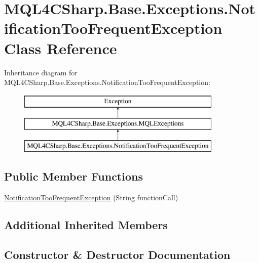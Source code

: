 \hypertarget{class_m_q_l4_c_sharp_1_1_base_1_1_exceptions_1_1_notification_too_frequent_exception}{}\section{M\+Q\+L4\+C\+Sharp.\+Base.\+Exceptions.\+Notification\+Too\+Frequent\+Exception Class Reference}
\label{class_m_q_l4_c_sharp_1_1_base_1_1_exceptions_1_1_notification_too_frequent_exception}
Inheritance diagram for M\+Q\+L4\+C\+Sharp.\+Base.\+Exceptions.\+Notification\+Too\+Frequent\+Exception\+:\begin{figure}[H]
\begin{center}
\leavevmode
\includegraphics[height=3.000000cm]{class_m_q_l4_c_sharp_1_1_base_1_1_exceptions_1_1_notification_too_frequent_exception}
\end{center}
\end{figure}
\subsection*{Public Member Functions}
\begin{DoxyCompactItemize}
\item 
\hyperlink{class_m_q_l4_c_sharp_1_1_base_1_1_exceptions_1_1_notification_too_frequent_exception_a81083b10ba5266a0893d4ff15eca0e06}{Notification\+Too\+Frequent\+Exception} (String function\+Call)
\end{DoxyCompactItemize}
\subsection*{Additional Inherited Members}


\subsection{Constructor \& Destructor Documentation}

